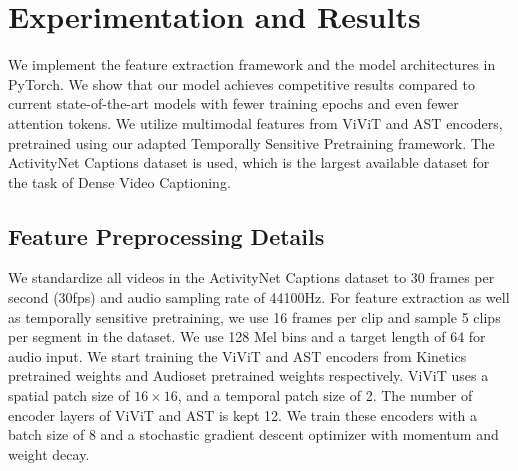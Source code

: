 \section{Experimentation and Results}
\par We implement the feature extraction framework and the model architectures in PyTorch. We show that our model achieves competitive results compared to current state-of-the-art models with fewer training epochs and even fewer attention tokens. We utilize multimodal features from ViViT and AST encoders, pretrained using our adapted Temporally Sensitive Pretraining framework. The ActivityNet Captions dataset is used, which is the largest available dataset for the task of Dense Video Captioning.

\subsection{Feature Preprocessing Details}
\par We standardize all videos in the ActivityNet Captions dataset to 30 frames per second (30fps) and audio sampling rate of 44100Hz. For feature extraction as well as temporally sensitive pretraining, we use 16 frames per clip and sample 5 clips per segment in the dataset. We use 128 Mel bins and a target length of 64 for audio input. We start training the ViViT and AST encoders from Kinetics pretrained weights and Audioset pretrained weights respectively. ViViT uses a spatial patch size of $16 \times 16$, and a temporal patch size of 2. The number of encoder layers of ViViT and AST is kept 12. We train these encoders with a batch size of 8 and a stochastic gradient descent optimizer with momentum and weight decay.

